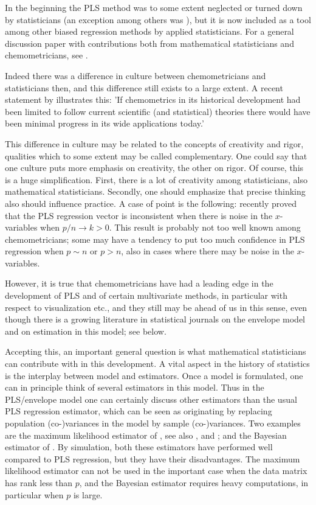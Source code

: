 \documentclass[a4paper, 11pt]{article}
\begin{document}
In the beginning the PLS method was to some extent neglected or turned down by statisticians (an exception among others was \citealp*{frank1993statistical}), but it is now included as a tool among other biased regression methods by applied statisticians. For a general discussion paper with contributions both from mathematical statisticians and chemometricians, see \citet{sundberg1999multivariate}.

Indeed there was a difference in culture between chemometricians and statisticians then, and this difference still exists to a large extent. A recent statement by \citet{munck2010physiochemical} illustrates this: 'If chemometrics in its historical development had been limited to follow current scientific (and statistical) theories there would have been minimal progress in its wide applications today.'

This difference in culture may be related to the concepts of creativity and rigor, qualities which to some extent may be called complementary. One could say that one culture puts more emphasis on creativity, the other on rigor. Of course, this is a huge simplification. First, there is a lot of creativity among statisticians, also mathematical statisticians. Secondly, one should emphasize that precise thinking also should influence practice. A case of point is the following: \citet{chung2010sparse} recently proved that the PLS regression vector is inconsistent when there is noise in the $x$-variables when $p/n\rightarrow k>0$. This result is probably not too well known among chemometricians; some may have a tendency to put too much confidence in PLS regression when $p\sim n$ or $p>n$, also in cases where there may be noise in the $x$-variables.

However, it is true that chemometricians have had a leading edge in the development of PLS and of certain multivariate methods, in particular with respect to visualization etc., and they still may be ahead of us in this sense, even though there is a growing literature in statistical journals on the envelope model and on estimation in this model; see below.

Accepting this, an important general question is what mathematical statisticians can contribute with in this development. A vital aspect in the history of statistics is the interplay between model and estimators. Once a model is formulated, one can in principle think of several estimators in this model. Thus in the PLS/envelope model one can certainly discuss other estimators than the usual PLS regression estimator, which can be seen as originating by replacing population (co-)variances in the model by sample (co-)variances. Two examples are the maximum likelihood estimator of \citet{cook2013envelopes}, see also \citet{cook2015envlp}, \citet{cook2016note} and \citet{cook2016algorithms}; and the Bayesian estimator of \citet{helland2012near}. By simulation, both these estimators have performed well compared to PLS regression, but they have their disadvantages. The maximum likelihood estimator can not be used in the important case when the data matrix has rank less than $p$, and the Bayesian estimator requires heavy computations, in particular when $p$ is large.
\end{document}
